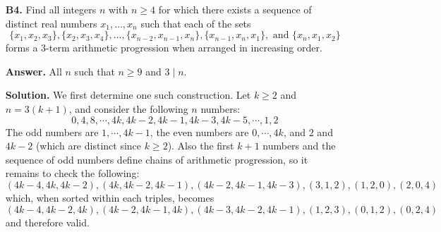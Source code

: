 \documentclass[11pt,a4paper]{article}
\begin{document}
\begin{enumerate}
		\begin{lemma}
			  All the rationals in $Q_v$ has the same $\nu_2$. 
			  That is, there exists a constant $c\triangleq c(v)$ such that $\forall q\in Q_v: \nu_2(q)=c$. 
		\end{lemma}
	    
	    \begin{proof}
	    	  Consider $q_1$ and $q_2\in Q_v$, and choose any point $a$ on the first iteration. 
	    	  We see that by the definition of $D$ and that $q_1v, q_2v\not\in D$, 
	    	  $a, a+q_1v, a+2q_1v, a+3q_1v, \cdots$ must be in alternating colour, 
	    	  so $a$ and $a+nq_1v$ are of the same colour if and only if $n$ is even. 
	    	  Similarly, $a$ and $a+nq_2v$ are of the same colour if and only if $n$ is even. 
	    	  Now consider integers $r_1, t_2$ such that $q_1r_1=q_2r_2$, and such that $\gcd(r_1, r_2)=1$. 
	    	  Since $r_1q_1v=r_2q_2v$, 
	    	  $r_1, r_2$ must have the same parity, i.e. both odd. 
	    	  Thus $\nu_2(q_1)=\nu_2(q_2)$ must hold here. 
	    \end{proof}
        
        Now consider what happens after the first iteration. 
        On second iteration, we see that we have a constant (integer) $c(v)$ such that 
        if $\nu_2(q)\neq c(v)$ then $qv$ is painted red. 
        Consider, now, any rational number $r$. 
        Let $s=2^{\min(c(v), \nu_2(r)) - 1}$, 
        then with $\nu_2(s) < \nu_2(r)$ we have $\nu_2(s)=\nu_2(s+r) < c(v)$, 
        which means that both $sv$ and $rv$ are painted red here. 
        It then follows that $rv$ will be painted red in the next round. 
        Considering all such $r\in\bbQ^+$ and all such classes $Q_v$ we have all points painted red after this iteration. 
		
		\item [\textbf{B4.}]
		Find all integers $n$ with $n \geq 4$ for which there exists a sequence of distinct real numbers $x_1, \ldots, x_n$ such that each of the sets$$\{x_1, x_2, x_3\}, \{x_2, x_3, x_4\},\ldots,\{x_{n-2}, x_{n-1}, x_n\}, \{x_{n-1}, x_n, x_1\},\text{ and } \{x_n, x_1, x_2\}$$forms a 3-term arithmetic progression when arranged in increasing order.
		
		\textbf{Answer.} 
		All $n$ such that $n\ge 9$ and $3\mid n$.
		
		\textbf{Solution.} 
		We first determine one such construction. 
		Let $k\ge 2$ and $n=3(k+1)$, 
		and consider the following $n$ numbers: 
		\[
		0, 4, 8, \cdots, 4k, 4k-2, 4k-1, 4k-3, 4k-5, \cdots, 1, 2
		\]
		The odd numbers are $1, \cdots, 4k-1$, the even numbers are $0, \cdots, 4k$, and $2$ and $4k-2$ (which are distinct since $k\ge 2$). 
		Also the first $k+1$ numbers and the sequence of odd numbers define chains of arithmetic progression, so it remains to check the following: 
		\[
		(4k-4, 4k, 4k-2), (4k, 4k-2, 4k-1), (4k-2, 4k-1, 4k-3), 
		(3, 1, 2), (1, 2, 0), (2, 0, 4)
		\]
		which, when sorted within each triples, becomes 
		\[
		(4k-4, 4k-2, 4k), (4k-2, 4k-1, 4k), (4k-3, 4k-2, 4k-1), 
		(1, 2, 3), (0, 1, 2), (0, 2, 4)
		\]
		and therefore valid. 
		

\end{enumerate}
\end{document}
